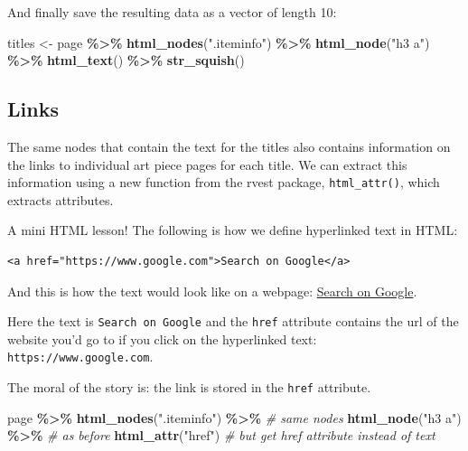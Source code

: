 \documentclass[
]{article}
\newenvironment{Shaded}{\begin{snugshade}}{\end{snugshade}}
\newcommand{\CommentTok}[1]{\textcolor[rgb]{0.56,0.35,0.01}{\textit{#1}}}
\newcommand{\FunctionTok}[1]{\textcolor[rgb]{0.13,0.29,0.53}{\textbf{#1}}}
\newcommand{\NormalTok}[1]{#1}
\newcommand{\OtherTok}[1]{\textcolor[rgb]{0.56,0.35,0.01}{#1}}
\newcommand{\SpecialCharTok}[1]{\textcolor[rgb]{0.81,0.36,0.00}{\textbf{#1}}}
\newcommand{\StringTok}[1]{\textcolor[rgb]{0.31,0.60,0.02}{#1}}
\begin{document}
And finally save the resulting data as a vector of length 10:

\begin{Shaded}
\begin{Highlighting}[]
\NormalTok{titles }\OtherTok{\textless{}{-}}\NormalTok{ page }\SpecialCharTok{\%\textgreater{}\%}
  \FunctionTok{html\_nodes}\NormalTok{(}\StringTok{".iteminfo"}\NormalTok{) }\SpecialCharTok{\%\textgreater{}\%}
  \FunctionTok{html\_node}\NormalTok{(}\StringTok{"h3 a"}\NormalTok{) }\SpecialCharTok{\%\textgreater{}\%}
  \FunctionTok{html\_text}\NormalTok{() }\SpecialCharTok{\%\textgreater{}\%}
  \FunctionTok{str\_squish}\NormalTok{()}
\end{Highlighting}
\end{Shaded}

\subsection{Links}\label{links}

The same nodes that contain the text for the titles also contains
information on the links to individual art piece pages for each title.
We can extract this information using a new function from the rvest
package, \texttt{html\_attr()}, which extracts attributes.

A mini HTML lesson! The following is how we define hyperlinked text in
HTML:

\begin{verbatim}
<a href="https://www.google.com">Search on Google</a>
\end{verbatim}

And this is how the text would look like on a webpage:
\href{https://www.google.com}{Search on Google}.

Here the text is \texttt{Search\ on\ Google} and the \texttt{href}
attribute contains the url of the website you'd go to if you click on
the hyperlinked text: \texttt{https://www.google.com}.

The moral of the story is: the link is stored in the \texttt{href}
attribute.

\begin{Shaded}
\begin{Highlighting}[]
\NormalTok{page }\SpecialCharTok{\%\textgreater{}\%}
  \FunctionTok{html\_nodes}\NormalTok{(}\StringTok{".iteminfo"}\NormalTok{) }\SpecialCharTok{\%\textgreater{}\%} \CommentTok{\# same nodes}
  \FunctionTok{html\_node}\NormalTok{(}\StringTok{"h3 a"}\NormalTok{) }\SpecialCharTok{\%\textgreater{}\%} \CommentTok{\# as before}
  \FunctionTok{html\_attr}\NormalTok{(}\StringTok{"href"}\NormalTok{) }\CommentTok{\# but get href attribute instead of text}
\end{Highlighting}
\end{Shaded}
\end{document}
